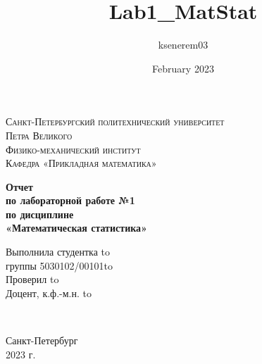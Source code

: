 \documentclass{article}
\title{Lab1_MatStat}
\author{ksenerem03 }
\date{February 2023}
\begin{document}
\begin{titlepage}
\begin{center}
\textsc{Санкт-Петербургский политехнический университет\\Петра Великого\\[5mm]
Физико-механический институт\\[2mm]
Кафедра «Прикладная математика»}

\vfill

\textbf{Отчет\\по лабораторной работе №1\\по дисциплине\\ «Математическая статистика»
\\[26mm]
}
\end{center}

\vspace{6em}

\newbox{\lbox}
\newlength{\maxl}
\setlength{\maxl}{\wd\lbox}
\hfill\parbox{14cm}{
\hspace*{5cm}\hspace*{-5cm}Выполнила студентка \hfill\hbox to\maxl{ }\\
\hspace*{5cm}\hspace*{-5cm}группы 5030102/00101\hfill\hbox to\\
\hspace*{5cm}\hspace*{-5cm}Проверил \hfill\hbox to\maxl{ }\\
\hspace*{5cm}\hspace*{-5cm}Доцент, к.ф.-м.н. \hfill\hbox to\\}
\\


\vspace{\fill}


\begin{center}
 Санкт-Петербург\\2023 г.
\end{center}
\end{titlepage}

\newpage

\tableofcontents
\newpage

\listoffigures
\newpage

\listoftables
\newpage
 
\end{document}
